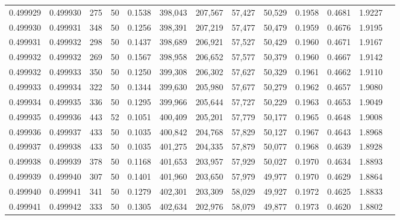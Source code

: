 \begin{tabular}{rrrrrrrrrrrrr}
0.499929 & 0.499930 & 275 &  50 &                                     0.1538 & 398,043 & 207,567 &  57,427 &  50,529 & 0.1958 & 0.4681 & 1.9227 \\
0.499930 & 0.499931 & 348 &  50 &                                     0.1256 & 398,391 & 207,219 &  57,477 &  50,479 & 0.1959 & 0.4676 & 1.9195 \\
0.499931 & 0.499932 & 298 &  50 &                                     0.1437 & 398,689 & 206,921 &  57,527 &  50,429 & 0.1960 & 0.4671 & 1.9167 \\
0.499932 & 0.499932 & 269 &  50 &                                     0.1567 & 398,958 & 206,652 &  57,577 &  50,379 & 0.1960 & 0.4667 & 1.9142 \\
0.499932 & 0.499933 & 350 &  50 &                                     0.1250 & 399,308 & 206,302 &  57,627 &  50,329 & 0.1961 & 0.4662 & 1.9110 \\
0.499933 & 0.499934 & 322 &  50 &                                     0.1344 & 399,630 & 205,980 &  57,677 &  50,279 & 0.1962 & 0.4657 & 1.9080 \\
0.499934 & 0.499935 & 336 &  50 &                                     0.1295 & 399,966 & 205,644 &  57,727 &  50,229 & 0.1963 & 0.4653 & 1.9049 \\
0.499935 & 0.499936 & 443 &  52 &                                     0.1051 & 400,409 & 205,201 &  57,779 &  50,177 & 0.1965 & 0.4648 & 1.9008 \\
0.499936 & 0.499937 & 433 &  50 &                                     0.1035 & 400,842 & 204,768 &  57,829 &  50,127 & 0.1967 & 0.4643 & 1.8968 \\
0.499937 & 0.499938 & 433 &  50 &                                     0.1035 & 401,275 & 204,335 &  57,879 &  50,077 & 0.1968 & 0.4639 & 1.8928 \\
0.499938 & 0.499939 & 378 &  50 &                                     0.1168 & 401,653 & 203,957 &  57,929 &  50,027 & 0.1970 & 0.4634 & 1.8893 \\
0.499939 & 0.499940 & 307 &  50 &                                     0.1401 & 401,960 & 203,650 &  57,979 &  49,977 & 0.1970 & 0.4629 & 1.8864 \\
0.499940 & 0.499941 & 341 &  50 &                                     0.1279 & 402,301 & 203,309 &  58,029 &  49,927 & 0.1972 & 0.4625 & 1.8833 \\
0.499941 & 0.499942 & 333 &  50 &                                     0.1305 & 402,634 & 202,976 &  58,079 &  49,877 & 0.1973 & 0.4620 & 1.8802 \\

\end{tabular}
